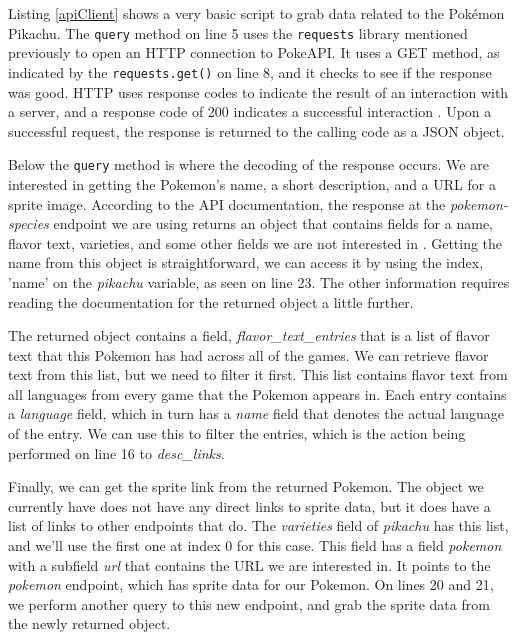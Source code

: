 \documentclass[12pt, oneside, a4paper]{book}
\begin{document}
      Listing \ref{apiClient} shows a very basic script to grab data related to the Pokémon Pikachu.
      The \lstinline!query! method on line 5 uses the \lstinline!requests! library mentioned previously to open an HTTP connection to PokeAPI.
      It uses a GET method, as indicated by the \lstinline!requests.get()! on line 8, and it checks to see if the response was good.
      HTTP uses response codes to indicate the result of an interaction with a server, and a response code of 200 indicates a successful interaction \autocite{mozillaHTTPResponseStatus}.
      Upon a successful request, the response is returned to the calling code as a JSON object.
      
      Below the \lstinline!query! method is where the decoding of the response occurs.
      We are interested in getting the Pokemon's name, a short description, and a URL for a sprite image.
      According to the API documentation, the response at the \textit{pokemon-species} endpoint we are using returns an object that contains fields for a name, flavor text, varieties, and some other fields we are not interested in \autocite{hallettPokeAPI}.
      Getting the name from this object is straightforward, we can access it by using the index, 'name' on the \textit{pikachu} variable, as seen on line 23.
      The other information requires reading the documentation for the returned object a little further.

      The returned object contains a field, \textit{flavor\_text\_entries} that is a list of flavor text that this Pokemon has had across all of the games.
      We can retrieve flavor text from this list, but we need to filter it first.
      This list contains flavor text from all languages from every game that the Pokemon appears in.
      Each entry contains a \textit{language} field, which in turn has a \textit{name} field that denotes the actual language of the entry.
      We can use this to filter the entries, which is the action being performed on line 16 to \textit{desc\_links}.

      Finally, we can get the sprite link from the returned Pokemon.
      The object we currently have does not have any direct links to sprite data, but it does have a list of links to other endpoints that do.
      The \textit{varieties} field of \textit{pikachu} has this list, and we'll use the first one at index 0 for this case.
      This field has a field \textit{pokemon} with a subfield \textit{url} that contains the URL we are interested in.
      It points to the \textit{pokemon} endpoint, which has sprite data for our Pokemon.
      On lines 20 and 21, we perform another query to this new endpoint, and grab the sprite data from the newly returned object.
\end{document}
